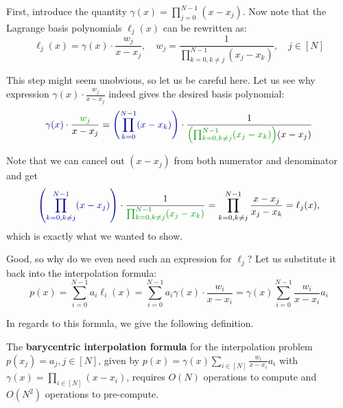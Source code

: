 \documentclass[../lecture-notes-148x210.tex]{subfiles}
\begin{document}
First, introduce the quantity $\gamma(x) = \prod_{j=0}^{N-1}(x-x_j)$. Now note that 
the Lagrange basis polynomials $\ell_j(x)$ can be rewritten as:
\begin{equation*}
    \ell_j(x) = \gamma(x) \cdot \frac{w_j}{x-x_j}, \quad w_j = \frac{1}{\prod_{k=0,k \neq j}^{N-1}(x_j-x_k)}, \quad j \in [N]
\end{equation*}

\begin{remark}
    This step might seem unobvious, so let us be careful here. Let us see why expression $\gamma(x) \cdot \frac{w_j}{x-x_j}$ 
    indeed gives the desired basis polynomial:
    \begin{equation*}
        \textcolor{blue!60!black}{\gamma(x)} \cdot \frac{\textcolor{green!60!black}{w_j}}{x-x_j} = \textcolor{blue!60!black}{\left(\prod_{k=0}^{N-1}(x-x_k) \right)} \cdot \frac{1}{\textcolor{green!60!black}{\left(\prod_{k=0,k \neq j}^{N-1}(x_j-x_k)\right)}(x-x_j)}
    \end{equation*}

    Note that we can cancel out $(x-x_j)$ from both numerator and denominator and get
    \begin{equation*}
        \textcolor{blue!60!black}{\left(\prod_{k=0,k\neq j}^{N-1}(x-x_j) \right)} \cdot \frac{1}{\textcolor{green!60!black}{\prod_{k=0,k \neq j}^{N-1}(x_j-x_k)}} = \prod_{k=0,k \neq j}^{N-1} \frac{x-x_j}{x_j-x_k} = \ell_j(x),
    \end{equation*}
    which is exactly what we wanted to show.
\end{remark}

Good, so why do we even need such an expression for $\ell_j$? Let us substitute it back into the interpolation formula:
\begin{equation*}
    p(x) = \sum_{i=0}^{N-1} a_i \ell_i(x) = \sum_{i=0}^{N-1}a_i \gamma(x) \cdot \frac{w_i}{x-x_i} = \gamma(x) \sum_{i=0}^{N-1} \frac{w_i}{x-x_i}a_i
\end{equation*}

In regards to this formula, we give the following definition.
\begin{proposition}\label{prop:barycentric}
    The \textbf{barycentric interpolation formula} for the interpolation problem
    $p(x_j)=a_j, j \in [N]$, given by $p(x) = \gamma(x) \sum_{i \in [N]}
    \frac{w_i}{x-x_i}a_i$ with $\gamma(x)=\prod_{i \in [N]}(x-x_i)$, requires $O(N)$ operations to compute and $O(N^2)$
    operations to pre-compute.
\end{proposition}
\end{document}
